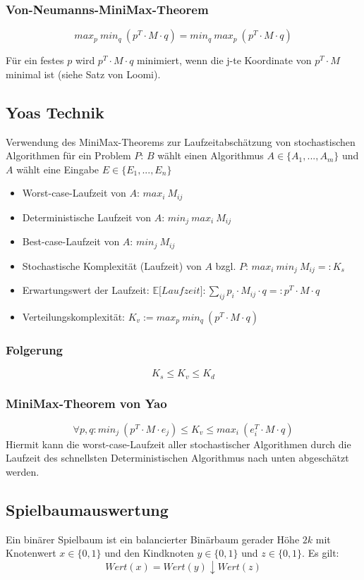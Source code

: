 \subsubsection{Von-Neumanns-MiniMax-Theorem}
\[max_p~min_q~(p^T \cdot M \cdot q) = min_q~max_p~(p^T \cdot M \cdot q)\]

Für ein festes \(p\) wird \(p^T \cdot M \cdot q\) minimiert, wenn die j-te Koordinate von \(p^T \cdot M\) minimal ist (siehe Satz von Loomi).


\subsection{Yoas Technik}
Verwendung des MiniMax-Theorems zur Laufzeitabschätzung von stochastischen Algorithmen für ein Problem \(P\):
\(B\) wählt einen Algorithmus \(A \in \{A_1,...,A_m\}\) und \(A\) wählt eine Eingabe \(E \in \{E_1,...,E_n\}\)
\begin{itemize}
	\item Worst-case-Laufzeit von \(A\): \(max_i~M_{ij}\)
	\item Deterministische Laufzeit von \(A\): \(min_j~max_i~M_{ij}\)
	\item Best-case-Laufzeit von \(A\): \(min_j~M_{ij}\)
	\item Stochastische Komplexität (Laufzeit) von \(A\) bzgl. \(P\): \(max_i~min_j~M_{ij} =: K_s\)
	\item Erwartungswert der Laufzeit: \(\mathbb{E}\lbrack Laufzeit \rbrack: \sum_{ij} p_i \cdot M_{ij} \cdot q =: p^T \cdot M \cdot q\)
	\item Verteilungskomplexität: \(K_v := max_p~min_q~(p^T \cdot M \cdot q)\)
\end{itemize}

\subsubsection{Folgerung}
\[K_s \leq K_v \leq K_d\]

\subsubsection{MiniMax-Theorem von Yao}
\[\forall p,q: min_j~(p^T \cdot M \cdot e_j) \leq K_v \leq max_i~(e_i^T \cdot M \cdot q)\]
Hiermit kann die worst-case-Laufzeit aller stochastischer Algorithmen durch die Laufzeit des schnellsten Deterministischen Algorithmus nach unten abgeschätzt werden.


\subsection{Spielbaumauswertung}
Ein binärer Spielbaum ist ein balancierter Binärbaum gerader Höhe \(2k\) mit Knotenwert \(x \in \{0,1\}\) und den Kindknoten \(y \in \{0,1\}\) und \(z \in \{0,1\}\). Es gilt:
\[Wert(x) = Wert(y) \downarrow Wert(z)\]

